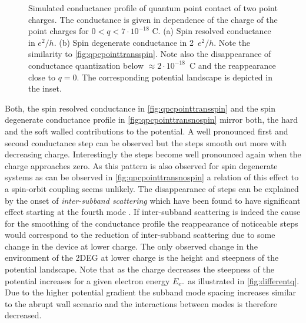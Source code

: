 \begin{figure}[h]
  \centering
  \caption{Simulated conductance profile of quantum point contact of two point charges. The conductance is given in dependence of the charge of the point charges for $0 < q <7\cdot 10^{-18}$ C. (a) Spin resolved conductance in $e^2/h$. (b) Spin degenerate conductance in 2~$e^2/h$. Note the similarity to \cref{fig:qpcpointtransspin}. Note also the disappearance of conductance quantization below $\approx 2\cdot10^{-18}$~C and the reappearance close to $q=0$. The corresponding potential landscape is depicted in the inset.}
\end{figure}
Both, the spin resolved conductance in \cref{fig:qpcpointtransspin} and the spin degenerate conductance profile in \cref{fig:qpcpointtransnospin} mirror both, the hard and the soft walled contributions to the potential. A well pronounced first and second conductance step can be observed but the steps smooth out more with decreasing charge. Interestingly the steps become well pronounced again when the charge approaches zero. As this pattern is also observed for spin degenerate systems as can be observed in \cref{fig:qpcpointtransnospin} a relation of this effect to a spin-orbit coupling seems unlikely. 
The disappearance of steps can be explained by the onset of \emph{inter-subband scattering} which have been found to have significant effect starting at the fourth mode \cite{Lehmann2011}. If inter-subband scattering is indeed the cause for the smoothing of the conductance profile the reappearance of noticeable steps would correspond to the reduction of inter-subband scattering due to some change in the device at lower charge. The only observed change in the environment of the 2DEG at lower charge is the height and steepness of the potential landscape.
Note that as the charge decreases the steepness of the potential increases for a given electron energy $E_{e^-}$ as illustrated in \cref{fig:differentq}. Due to the higher potential gradient the subband mode spacing increases similar to the abrupt wall scenario and the interactions between modes is therefore decreased.
